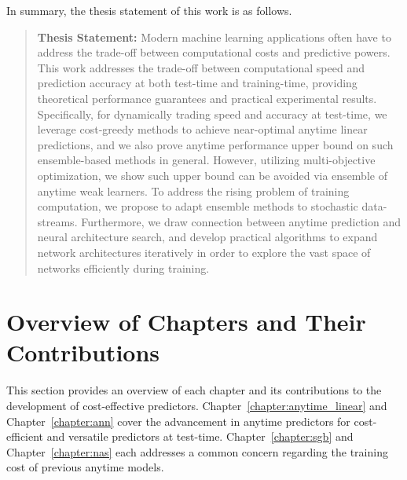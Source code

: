In summary, the thesis statement of this work is as follows. 
\begin{quotation}
\textbf{Thesis Statement:} 
Modern machine learning applications often have to address the trade-off between computational costs and predictive powers. 
This work addresses the trade-off between computational speed and prediction accuracy at both test-time and training-time, providing theoretical performance guarantees and practical experimental results. 
Specifically, for dynamically trading speed and accuracy at test-time, we leverage cost-greedy methods to achieve near-optimal anytime linear predictions, and we 
also prove anytime performance upper bound on such ensemble-based methods in general. 
However, utilizing multi-objective optimization,
we show such upper bound can be avoided via ensemble of anytime weak learners.
To address the rising problem of training computation, we propose to adapt ensemble methods to stochastic data-streams. 
Furthermore, we draw connection between anytime prediction and neural architecture search, 
and develop practical algorithms to expand network architectures iteratively in order to explore the vast space of networks efficiently during training. 
\end{quotation}


\section{Overview of Chapters and Their Contributions}

This section provides an overview of each chapter and its contributions to the development of cost-effective predictors. 
Chapter~\ref{chapter:anytime_linear} and Chapter~\ref{chapter:ann} cover the advancement in anytime predictors for cost-efficient and versatile predictors at test-time. Chapter~\ref{chapter:sgb} and Chapter~\ref{chapter:nas} each addresses a common concern regarding the training cost of previous anytime models. 

